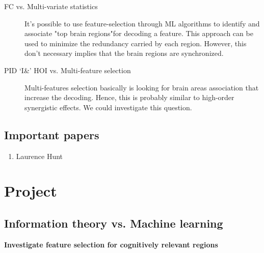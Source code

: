 \documentclass[a4paper,11pt]{article}
\begin{document}
\begin{description}
    \item[FC vs. Multi-variate statistics] It's possible to use feature-selection through ML algorithms to identify and associate "top brain regions"for decoding a feature. This approach can be used to minimize the redundancy carried by each region. However, this don't necessary implies that the brain regions are synchronized.
    \item[PID `I\&' HOI vs. Multi-feature selection] Multi-features selection basically is looking for brain areas association that increase the decoding. Hence, this is probably similar to high-order synergistic effects. We could investigate this question.
\end{description}


\subsection{Important papers}

\begin{enumerate}
    \item Laurence Hunt \cite{hunt2017distributed}
\end{enumerate}

\section{Project}

\subsection{Information theory vs. Machine learning}

\begin{bigpic}
    \begin{center}
        \textbf{Investigate feature selection for cognitively relevant regions} 
    \end{center}
\end{bigpic}
\end{document}
